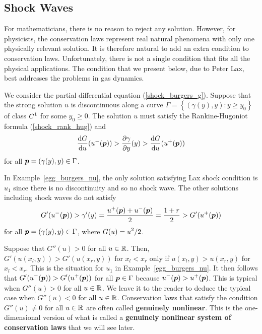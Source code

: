 \subsection{Shock Waves}

For mathematicians, there is no reason to reject any
solution.  However, for physicists, the conservation laws represent
real natural phenomena with only one physically relevant solution.  It
is therefore natural to add an extra condition to conservation laws.
Unfortunately, there is not a single condition that fits all the
physical applications.  The condition that we present below, due to
Peter Lax, best addresses the problems in gas dynamics.

\begin{defn} \label{LSCdef1}
We consider the partial differential equation (\ref{shock_burgers_g}).
Suppose that the strong solution $u$ is discontinuous along a curve
$\Gamma = \left\{ (\gamma(y),y) : y \geq y_0\right\}$ of class
$\displaystyle C^1$ for some $y_0 \geq 0$.  The solution $u$
must satisfy the Rankine-Hugoniot formula (\ref{shock_rank_hug}) and
\begin{equation} \label{entropy1}
\frac{\mathrm{d}G}{\mathrm{d}{u}}(u^-({\bm{p}})) > \frac{\partial{\gamma}}{\partial y}(y) > \frac{\mathrm{d}G}{\mathrm{d}{u}}(u^+({\bm{p}}))
\end{equation}
for all ${\bm{p}}=(\gamma(y),y) \in \Gamma$.
\end{defn}

In Example~\ref{egg_burgers_nu}, the only solution satisfying Lax
shock condition is $u_1$ since there is no discontinuity and so no
shock wave.  The other solutions including shock waves do not satisfy
\[
G'(u^-({\bm{p}})) > \gamma'(y)
= \frac{u^+({\bm{p}}) + u^-({\bm{p}})}{2} = \frac{1+r}{2} > G'(u^+({\bm{p}}))
\]
for all ${\bm{p}}=(\gamma(y),y) \in \Gamma$, where
$\displaystyle G(u) = u^2/2$.

Suppose that $G''(u) > 0$ for all $u \in \mathbb{R}$.  Then,
$G'(u(x_l,y)) > G'(u(x_r,y))$ for $x_l < x_r$ only if
$u(x_l,y) > u(x_r,y)$ for $x_l < x_r$.  This is the situation for
$u_1$ in Example~\ref{egg_burgers_nu}.  It then follows that
$\displaystyle G'(u^-({\bm{p}})) > G'(u^+({\bm{p}}))$ for all ${\bm{p}} \in \Gamma$
because $\displaystyle u^-({\bm{p}}) > u^+({\bm{p}})$.
This is typical when $G''(u) > 0$ for all $u \in \mathbb{R}$.  We leave it to
the reader to deduce the typical case when $G''(u) < 0$ for all $u \in \mathbb{R}$.
Conservation laws that satisfy the condition $G''(u) \neq 0$ for all
$u\in \mathbb{R}$ are often called
{\bfseries genuinely nonlinear}.
This is the one-dimensional version of what is called a
{\bfseries genuinely nonlinear system of conservation
laws} that we will see later.

